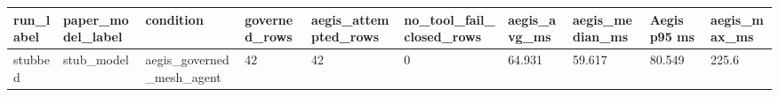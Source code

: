 \begin{tabular}{llllllllll}
 \hline
run\_label & paper\_model\_label & condition & governed\_rows & aegis\_attempted\_rows & no\_tool\_fail\_closed\_rows & aegis\_avg\_ms & aegis\_median\_ms & Aegis p95 ms & aegis\_max\_ms \\
 \hline
stubbed & stub\_model & aegis\_governed\_mesh\_agent & 42 & 42 & 0 & 64.931 & 59.617 & 80.549 & 225.6 \\
 \hline
\end{tabular}
